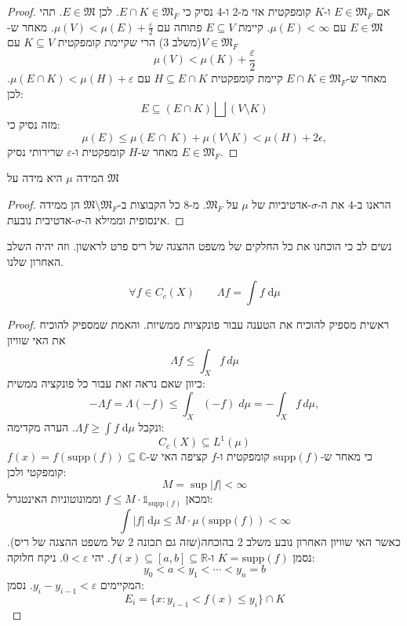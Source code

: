 \documentclass{tstextbook}
\begin{document}
\begin{proof}
אם \(E \in \mathfrak{M}_{F}\) ו-\(K\) קומפקטית אזי מ-2 ו-4 נסיק כי \(E\cap K \in \mathfrak{M}_{F}\). לכן \(E \in \mathfrak{M}\). תהי \(E \in \mathfrak{M}\) עם \(\mu(E)<\infty\). קיימת \(E \subseteq V\) פתוחה עם \(\mu(V)<\mu(E)+\frac{\varepsilon}{2}\). מאחר ש-\(V \in \mathfrak{M}_{F}\)(משלב 3) הרי שקיימת קומפקטית \(K \subseteq V\) עם
$$\mu(V)<\mu(K)+\frac{\varepsilon}{2}$$
מאחר ש-\(E\cap K \in \mathfrak{M}_{F}\) קיימת קומפקטית \(H \subseteq E \cap K\) עם \(\mu\left( E\cap K \right)<\mu(H)+\varepsilon\). לכן:
$$E\subseteq \left( E\cap K \right)\bigsqcup \left( V \setminus  K \right)$$
מזה נסיק כי:
$$\mu(E)\leq\mu\left( E\,\cap\,K \right)+\mu\left( V\setminus K \right)<\mu(H)+2\epsilon,$$
מאחר ש-\(H\) קומפקטית ו-\(\varepsilon\) שרירותי נסיק \(E \in \mathfrak{M}_{F}\).

\end{proof}
\begin{lemma}[שלב 9]
המידה \(\mu\) היא מידה על \(\mathfrak{M}\)

\end{lemma}
\begin{proof}
הראנו ב-\(4\) את ה-\(\sigma\)-אדטיביות של \(\mu\) על \(\mathfrak{M}_{F}\). מ-8 כל הקבוצות ב-\(\mathfrak{M}\setminus \mathfrak{M}_{F}\) הן ממידה אינסופית וממילא ה-\(\sigma\)-אדטיבית נובעת.

\end{proof}
\begin{remark}
נשים לב כי הוכחנו את כל החלקים של משפט ההצגה של ריס פרט לראשון. וזה יהיה השלב האחרון שלנו.

\end{remark}
\begin{lemma}[שלב 10]
$$\forall f \in C_{c}(X)\qquad \Lambda f=\int f \;\mathrm{d} \mu $$

\end{lemma}
\begin{proof}
ראשית מספיק להוכיח את הטענה עבור פונקציות ממשיות. והאמת שמספיק להוכיח את האי שוויון
$$\Lambda f\leq\int_{X}f\,d\mu$$
כיוון שאם נראה זאת עבור כל פונקציה ממשית:
$$-\Lambda f=\Lambda(-f)\leq\int_{X}(-f)\;d\mu=-\int_{X}f\,d\mu,$$
ונקבל \(\Lambda f \geq \int f \;\mathrm{d} \mu\).
הערה מקדימה:
$$C_{c}(X)\subseteq L^{1}\left( \mu \right)$$
כי מאחר ש-\(\text{supp}(f)\) קומפקטית ו-\(f\) קציפה האי ש-\(f(x)=f\left( \text{supp}(f) \right)\subseteq \mathbb{C}\) קומפקטי ולכן:
$$M=\sup \lvert f \rvert < \infty$$
ומכאן \(f\leq M\cdot \mathbb{1}_{\text{supp}(f)}\) וממונוטוניות האינטגרל:
$$\int \lvert f \rvert  \;\mathrm{d} \mu \leq M \cdot \mu\left( \text{supp}(f) \right)<\infty $$
כאשר האי שוויון האחרון נובע משלב 2 בהוכחה(שזה גם תכונה 2 של משפט ההצגה של ריס). נסמן \(K=\text{supp}(f)\) ו-\(f(x)\subseteq [a,b]\subseteq \mathbb{R}\). יהי \(0<\varepsilon\). ניקח חלוקה:
$$y_{0}<a<y_{1}<\cdots<y_{n}=b$$
המקיימים \(y_{i}-y_{i-1}<\varepsilon\). נסמן:
$$E_{i}=\{x\colon y_{i-1}<f(x)\leq y_{i}\}\cap K$$

\end{proof}
\end{document}
